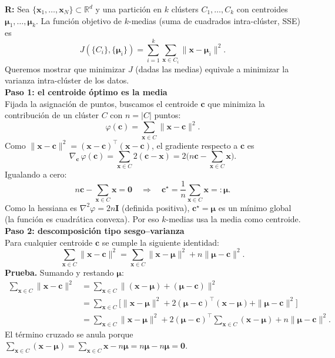 \textbf{R:} Sea $\{\mathbf{x}_1, \dots, \mathbf{x}_N\} \subset \mathbb{R}^d$ y una partición en $k$ clústers $C_1, \dots, C_k$ con centroides $\boldsymbol{\mu}_1, \dots, \boldsymbol{\mu}_k$. La función objetivo de $k$-medias (suma de cuadrados intra-clúster, SSE) es
\[
    J(\{C_i\}, \{\boldsymbol{\mu}_i\}) = \sum_{i=1}^{k} \sum_{\mathbf{x} \in C_i} \| \mathbf{x} - \boldsymbol{\mu}_i \|^2.
\]
Queremos mostrar que minimizar $J$ (dadas las medias) equivale a minimizar la varianza intra-clúster de los datos.\\

\textbf{Paso 1: el centroide óptimo es la media}\\

Fijada la asignación de puntos, buscamos el centroide $\mathbf{c}$ que minimiza la contribución de un clúster $C$ con $n = |C|$ puntos:
\[
    \varphi(\mathbf{c}) = \sum_{\mathbf{x} \in C} \| \mathbf{x} - \mathbf{c} \|^2.
\]
Como $\|\mathbf{x} - \mathbf{c}\|^2 = (\mathbf{x} - \mathbf{c})^\top (\mathbf{x} - \mathbf{c})$, el gradiente respecto a $\mathbf{c}$ es
\[
    \nabla_{\mathbf{c}} \, \varphi(\mathbf{c}) = \sum_{\mathbf{x} \in C} 2 (\mathbf{c} - \mathbf{x}) = 2 \Big( n \mathbf{c} - \sum_{\mathbf{x} \in C} \mathbf{x} \Big).
\]
Igualando a cero:
\[
    n \mathbf{c} - \sum_{\mathbf{x} \in C} \mathbf{x} = \mathbf{0}
    \quad \Longrightarrow \quad
    \mathbf{c}^\star = \frac{1}{n} \sum_{\mathbf{x} \in C} \mathbf{x} =: \boldsymbol{\mu}.
\]
Como la hessiana es $\nabla^2 \varphi = 2n \mathbf{I}$ (definida positiva), $\mathbf{c}^\star = \boldsymbol{\mu}$ es un mínimo global (la función es cuadrática convexa). Por eso $k$-medias usa la media como centroide.\\

\textbf{Paso 2: descomposición tipo sesgo--varianza}\\

Para cualquier centroide $\mathbf{c}$ se cumple la siguiente identidad:
\[
    \sum_{\mathbf{x} \in C} \| \mathbf{x} - \mathbf{c} \|^2 = \sum_{\mathbf{x} \in C} \| \mathbf{x} - \boldsymbol{\mu} \|^2 + n \| \boldsymbol{\mu} - \mathbf{c} \|^2.
\]
\textbf{Prueba.} Sumando y restando $\boldsymbol{\mu}$:
\begin{align*}
    \sum_{\mathbf{x} \in C} \| \mathbf{x} - \mathbf{c} \|^2
    &= \sum_{\mathbf{x} \in C} \| (\mathbf{x} - \boldsymbol{\mu}) + (\boldsymbol{\mu} - \mathbf{c}) \|^2 \\
    &= \sum_{\mathbf{x} \in C} \Big[ \| \mathbf{x} - \boldsymbol{\mu} \|^2 + 2 (\boldsymbol{\mu} - \mathbf{c})^\top (\mathbf{x} - \boldsymbol{\mu}) + \| \boldsymbol{\mu} - \mathbf{c} \|^2 \Big] \\
    &= \sum_{\mathbf{x} \in C} \| \mathbf{x} - \boldsymbol{\mu} \|^2 + 2 (\boldsymbol{\mu} - \mathbf{c})^\top \sum_{\mathbf{x} \in C} (\mathbf{x} - \boldsymbol{\mu}) + n \| \boldsymbol{\mu} - \mathbf{c} \|^2.
\end{align*}
El término cruzado se anula porque $\sum_{\mathbf{x} \in C} (\mathbf{x} - \boldsymbol{\mu}) = \sum_{\mathbf{x} \in C} \mathbf{x} - n \boldsymbol{\mu} = n \boldsymbol{\mu} - n \boldsymbol{\mu} = \mathbf{0}$.

